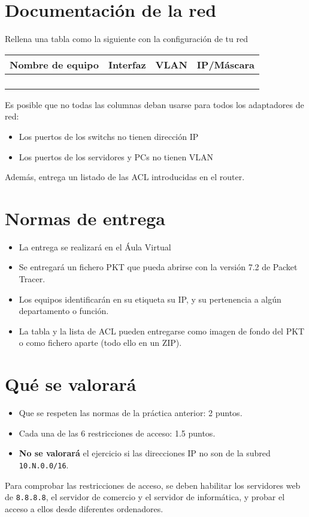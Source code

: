 \section{Documentación de la red}
Rellena una tabla como la siguiente con la configuración de tu red

\begin{center}
  \begin{tabular}{|c|c|c|c|}
    \hline
    Nombre de equipo & Interfaz & VLAN & IP/Máscara \\
    \hline
                     & & & \\
                     & & & \\
                     & & & \\
                     & & & \\
    \hline
  \end{tabular}
\end{center}

Es posible que no todas las columnas deban usarse para todos los adaptadores de red:
\begin{itemize}
\item Los puertos de los switchs no tienen dirección IP
\item Los puertos de los servidores y PCs no tienen VLAN
\end{itemize}

Además, entrega un listado de las ACL introducidas en el router.

\section{Normas de entrega}
\begin{itemize}
  
\item La entrega se realizará en el Áula Virtual
\item Se entregará un fichero PKT que pueda abrirse con la versión 7.2 de Packet Tracer.
\item Los equipos identificarán en su etiqueta su IP, y su pertenencia a algún departamento o función.
\item La tabla y la lista de ACL pueden entregarse como imagen de fondo del PKT o como fichero aparte (todo ello en un ZIP).
\end{itemize}

\section{Qué se valorará}
\begin{itemize}
\item Que se respeten las normas de la práctica anterior: 2 puntos.
\item Cada una de las 6 restricciones de acceso: 1.5 puntos.
\item \textbf{No se valorará} el ejercicio si las direcciones IP no son de la subred \texttt{10.N.0.0/16}.
\end{itemize}

Para comprobar las restricciones de acceso, se deben habilitar los servidores web de \texttt{8.8.8.8}, el servidor de comercio y el servidor de informática, y probar el acceso a ellos desde diferentes ordenadores.




